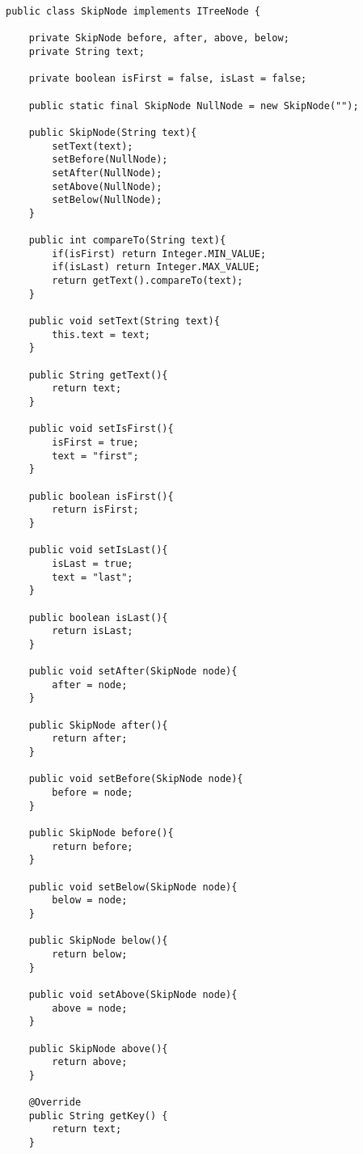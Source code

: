 \begin{lstlisting}[caption=Skip List classes Source code - SkipNode]
public class SkipNode implements ITreeNode {

	private SkipNode before, after, above, below;
	private String text;
	
	private boolean isFirst = false, isLast = false;
	
	public static final SkipNode NullNode = new SkipNode("");
	
	public SkipNode(String text){
		setText(text);
		setBefore(NullNode);
		setAfter(NullNode);
		setAbove(NullNode);
		setBelow(NullNode);
	}
	
	public int compareTo(String text){
		if(isFirst) return Integer.MIN_VALUE;
		if(isLast) return Integer.MAX_VALUE;
		return getText().compareTo(text);
	}
	
	public void setText(String text){
		this.text = text;
	}
	
	public String getText(){
		return text;
	}
	
	public void setIsFirst(){
		isFirst = true;
		text = "first";
	}
	
	public boolean isFirst(){
		return isFirst;
	}
	
	public void setIsLast(){
		isLast = true;
		text = "last";
	}
	
	public boolean isLast(){
		return isLast;
	}
	
	public void setAfter(SkipNode node){
		after = node;
	}
	
	public SkipNode after(){
		return after;
	}
	
	public void setBefore(SkipNode node){
		before = node;
	}
	
	public SkipNode before(){
		return before;
	}
	
	public void setBelow(SkipNode node){
		below = node;
	}
	
	public SkipNode below(){
		return below;
	}
	
	public void setAbove(SkipNode node){
		above = node;
	}
	
	public SkipNode above(){
		return above;
	}

	@Override
	public String getKey() {
		return text;
	}
\end{lstlisting}